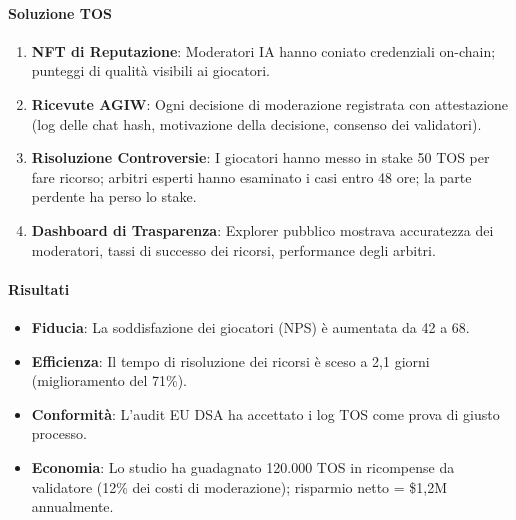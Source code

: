 \documentclass[11pt]{article}
\begin{document}
\begin{itemize}[noitemsep]
\paragraph{Soluzione TOS}
\begin{enumerate}[noitemsep]
  \item \textbf{NFT di Reputazione}: Moderatori IA hanno coniato credenziali on-chain; punteggi di qualità visibili ai giocatori.
  \item \textbf{Ricevute AGIW}: Ogni decisione di moderazione registrata con attestazione (log delle chat hash, motivazione della decisione, consenso dei validatori).
  \item \textbf{Risoluzione Controversie}: I giocatori hanno messo in stake 50 TOS per fare ricorso; arbitri esperti hanno esaminato i casi entro 48 ore; la parte perdente ha perso lo stake.
  \item \textbf{Dashboard di Trasparenza}: Explorer pubblico mostrava accuratezza dei moderatori, tassi di successo dei ricorsi, performance degli arbitri.
\end{enumerate}

\paragraph{Risultati}
\begin{itemize}[noitemsep]
  \item \textbf{Fiducia}: La soddisfazione dei giocatori (NPS) è aumentata da 42 a 68.
  \item \textbf{Efficienza}: Il tempo di risoluzione dei ricorsi è sceso a 2,1 giorni (miglioramento del 71\%).
  \item \textbf{Conformità}: L'audit EU DSA ha accettato i log TOS come prova di giusto processo.
  \item \textbf{Economia}: Lo studio ha guadagnato 120.000 TOS in ricompense da validatore (12\% dei costi di moderazione); risparmio netto = \$1,2M annualmente.
\end{itemize}


\end{itemize}
\end{document}
